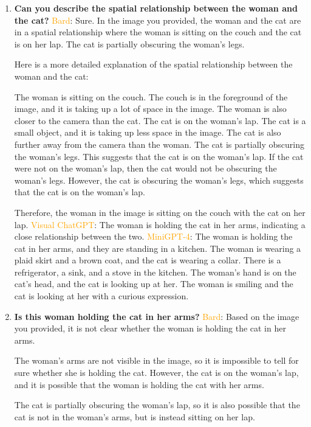 \begin{enumerate}
    \item \textbf{Can you describe the spatial relationship between the woman and the cat?}
    \subitem \textcolor{orange}{Bard}: 
    Sure. In the image you provided, the woman and the cat are in a spatial relationship where the woman is sitting on the couch and the cat is on her lap. The cat is partially obscuring the woman's legs.
    
    Here is a more detailed explanation of the spatial relationship between the woman and the cat:
    
    The woman is sitting on the couch. The couch is in the foreground of the image, and it is taking up a lot of space in the image. The woman is also closer to the camera than the cat.
    The cat is on the woman's lap. The cat is a small object, and it is taking up less space in the image. The cat is also further away from the camera than the woman.
    The cat is partially obscuring the woman's legs. This suggests that the cat is on the woman's lap.
    If the cat were not on the woman's lap, then the cat would not be obscuring the woman's legs. However, the cat is obscuring the woman's legs, which suggests that the cat is on the woman's lap.
    
    Therefore, the woman in the image is sitting on the couch with the cat on her lap.
    \subitem \textcolor{orange}{Visual ChatGPT}: The woman is holding the cat in her arms, indicating a close relationship between the two.
    \subitem \textcolor{orange}{MiniGPT-4}: The woman is holding the cat in her arms, and they are standing in a kitchen. The woman is wearing a plaid skirt and a brown coat, and the cat is wearing a collar. There is a refrigerator, a sink, and a stove in the kitchen. The woman’s hand is on the cat’s head, and the cat is looking up at her. The woman is smiling and the cat is looking at her with a curious expression.
    \item \textbf{Is this woman holding the cat in her arms?}
    \subitem \textcolor{orange}{Bard}: 
    Based on the image you provided, it is not clear whether the woman is holding the cat in her arms.
    
    The woman's arms are not visible in the image, so it is impossible to tell for sure whether she is holding the cat. However, the cat is on the woman's lap, and it is possible that the woman is holding the cat with her arms.
    
    The cat is partially obscuring the woman's lap, so it is also possible that the cat is not in the woman's arms, but is instead sitting on her lap.
    

\end{enumerate}

